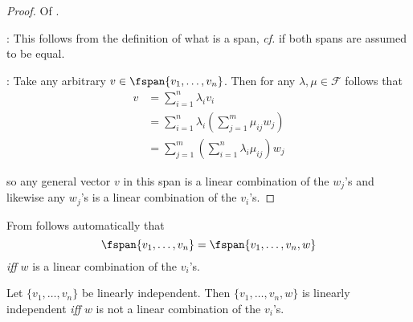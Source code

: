 \begin{proof}
	Of .
	\begin{flushleft}
		\proofright: This follows from the definition of what is a span,
		\textit{cf.}  if both spans are
		assumed to be equal.
	\end{flushleft}
	\begin{flushleft}
		\proofleft: Take any arbitrary $v\in\fspan\{v_1,\dots,v_n\}$. Then
		for any $\lambda,\mu\in\mathcal{F}$ follows that
		\begin{align*}
			v & = \sum_{i=1}^n \lambda_i v_i                                       \\
			  & = \sum_{i=1}^n \lambda_i \left(\sum_{j=1}^m \mu_{ij} w_j\right)    \\
			  & = \sum_{j=1}^m \left(\sum_{i=1}^n \lambda_i \mu_{ij} \right) w_{j}
		\end{align*}
	\end{flushleft}
	so any general vector $v$ in this span is a linear combination of the $w_j$'s
	and likewise any $w_j$'s is a linear combination of the $v_i$'s.
\end{proof}

\begin{crl}\label{crl-span-equality}
	From  follows automatically that
	\begin{equation*}
		\fspan\{v_1,\dots,v_n\}=\fspan\{v_1,\dots,v_n,w\}
	\end{equation*}
	\textit{iff} $w$ is a linear combination of the $v_i$'s.
\end{crl}

\begin{thm}\label{thm-span-expand-linearly-independence}
	Let $\{v_1,\dots,v_n\}$ be linearly independent. Then $\{v_1,\dots,v_n,w\}$
	is linearly independent \textit{iff} $w$ is not a linear combination of the
	$v_i$'s.
\end{thm}

